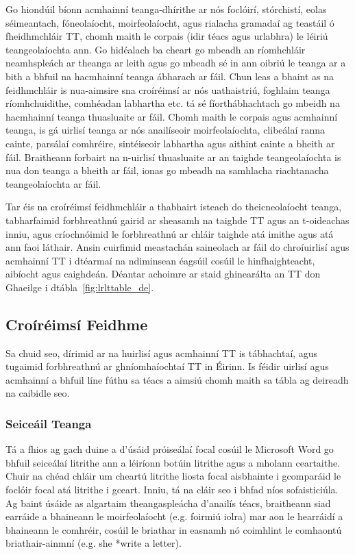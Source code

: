 \begin{multicols}{2}
Go hiondúil bíonn acmhainní teanga-dhírithe ar nós foclóirí, stórchistí, eolas séimeantach, fóneolaíocht, moirfeolaíocht, agus rialacha gramadaí ag teastáil ó fheidhmchláir TT, chomh maith le corpais (idir téacs agus urlabhra) le léiriú teangeolaíochta ann. Go hidéalach ba cheart go mbeadh an ríomhchláir neamhspleách ar theanga ar leith agus go mbeadh sé in ann oibriú le teanga ar a bith a bhfuil na hacmhainní teanga ábharach ar fáil. Chun leas a bhaint as na feidhmchláir is nua-aimsire sna croíréimsí ar nós uathaistriú, foghlaim teanga ríomhchuidithe, comhéadan  labhartha etc. tá sé fíorthábhachtach go mbeidh na hacmhainní teanga thuasluaite ar fáil. Chomh maith le corpais agus acmhainní teanga, is gá uirlisí teanga ar nós anailíseoir moirfeolaíochta, clibeálaí ranna cainte, parsálaí comhréire, sintéiseoir labhartha agus aithint cainte a bheith ar fáil. Braitheann forbairt na n-uirlisí thuasluaite ar an taighde teangeolaíochta is nua don teanga a bheith ar fáil, ionas go mbeadh na samhlacha riachtanacha  teangeolaíochta  ar fáil.

Tar éis na croíréimsí feidhmchláir a thabhairt isteach do theicneolaíocht teanga, tabharfaimid forbhreathnú gairid ar sheasamh na taighde TT agus an t-oideachas inniu, agus críochnóimid le forbhreathnú ar chláir taighde atá imithe agus atá ann faoi láthair. Ansin cuirfimid meastachán saineolach ar fáil do chroíuirlisí agus acmhainní TT i dtéarmaí na ndiminsean éagsúil cosúil le hinfhaighteacht, aibíocht agus caighdeán. Déantar achoimre ar staid ghinearálta an TT don Ghaeilge i dtábla~\ref{fig:lrlttable_de}.


\subsection{Croíréimsí Feidhme} 

Sa chuid seo, dírimid ar na huirlisí agus acmhainní TT is tábhachtaí, agus tugaimid forbhreathnú ar ghníomhaíochtaí TT in Éirinn. Is féidir uirlisí agus acmhainní a bhfuil líne fúthu sa téacs a aimsiú chomh maith sa tábla ag deireadh na caibidle seo. 

\subsubsection{Seiceáil Teanga}

Tá a fhios ag gach duine a d’úsáid próiseálaí focal cosúil le Microsoft Word go bhfuil seiceálaí litrithe ann a léiríonn botúin litrithe agus a mholann ceartaithe. Chuir na chéad chláir um cheartú litrithe liosta focal aisbhainte i gcomparáid le foclóir focal atá litrithe i gceart. Inniu, tá na cláir seo i bhfad níos sofaisticiúla. Ag baint úsáide as algartaim theangaspleácha d’anailís téacs, braitheann siad earráide a bhaineann le moirfeolaíocht (e.g. foirmiú iolra) mar aon le hearráidí a bhaineann le comhréir, cosúil le briathar in easnamh nó coimhlint le comhaontú briathair-ainmní (e.g. she *write a letter). 


\end{multicols}
